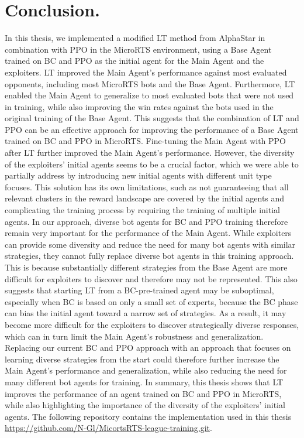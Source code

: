 \documentclass[10pt,twocolumn,letterpaper]{article}
\begin{document}
\section{Conclusion.}
\label{sec:conclusion}
In this thesis, we implemented a modified LT method from AlphaStar \cite{vinyals2019alphastar} in combination with PPO in the MicroRTS environment, using a Base Agent trained on BC and PPO as the initial agent for the Main Agent and the exploiters.
\break\break
LT improved the Main Agent's performance against most evaluated opponents, including most MicroRTS bots and the Base Agent.
Furthermore, LT enabled the Main Agent to generalize to most evaluated bots that were not used in training, while also improving the win rates against the bots used in the original training of the Base Agent.
This suggests that the combination of LT and PPO can be an effective approach for improving the performance of a Base Agent trained on BC and PPO in MicroRTS.
\break\break
Fine-tuning the Main Agent with PPO after LT further improved the Main Agent's performance.
\break\break
However, the diversity of the exploiters' initial agents seems to be a crucial factor, which we were able to partially address by introducing new initial agents with different unit type focuses.
This solution has its own limitations, such as not guaranteeing that all relevant clusters in the reward landscape are covered by the initial agents and complicating the training process by requiring the training of multiple initial agents.
In our approach, diverse bot agents for BC and PPO training therefore remain very important for the performance of the Main Agent.
While exploiters can provide some diversity and reduce the need for many bot agents with similar strategies, they cannot fully replace diverse bot agents in this training approach.
This is because substantially different strategies from the Base Agent are more difficult for exploiters to discover and therefore may not be represented.
\break\break
This also suggests that starting LT from a BC-pre-trained agent may be suboptimal, especially when BC is based on only a small set of experts, because the BC phase can bias the initial agent toward a narrow set of strategies.
As a result, it may become more difficult for the exploiters to discover strategically diverse responses, which can in turn limit the Main Agent's robustness and generalization.
Replacing our current BC and PPO approach with an approach that focuses on learning diverse strategies from the start could therefore further increase the Main Agent's performance and generalization, while also reducing the need for many different bot agents for training.
\break\break
In summary, this thesis shows that LT improves the performance of an agent trained on BC and PPO in MicroRTS, while also highlighting the importance of the diversity of the exploiters' initial agents.
The following repository contains the implementation used in this thesis \url{https://github.com/N-Gl/MicortsRTS-league-training.git}.
\end{document}
